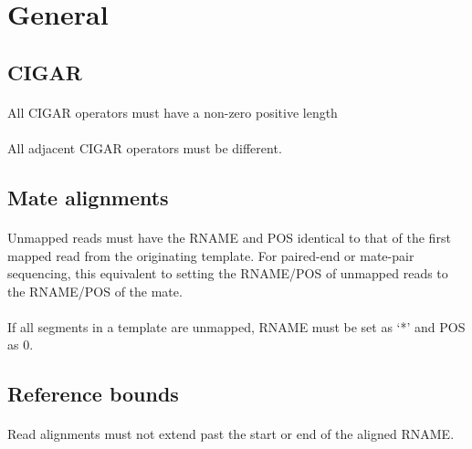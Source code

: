 \documentclass[10pt]{article}
\begin{document}
\section{General}

\subsection{CIGAR}

\paragraph{}

All CIGAR operators must have a non-zero positive length

\paragraph{}

All adjacent CIGAR operators must be different.

\subsection{Mate alignments}

\paragraph{}

Unmapped reads must have the RNAME and POS identical to that of the first mapped read
from the originating template. For paired-end or mate-pair sequencing, this equivalent
to setting the RNAME/POS of unmapped reads to the RNAME/POS of the mate.

\paragraph{}

If all segments in a template are unmapped, RNAME must be set as `*' and POS as 0.

\subsection{Reference bounds}

\paragraph{}

Read alignments must not extend past the start or end of the aligned RNAME.
\end{document}
